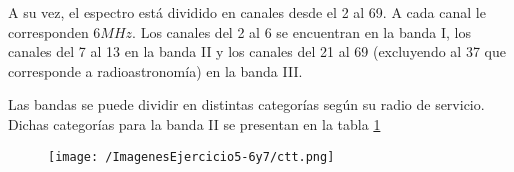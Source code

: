 A su vez, el espectro está dividido en canales desde el 2 al 69. A cada canal le corresponden $6 MHz$. Los canales del 2 al 6 se encuentran en la banda I, los canales del 7 al 13 en la banda II y los canales del 21 al 69 (excluyendo al 37 que corresponde a radioastronomía) en la banda III.

Las bandas se puede dividir en distintas categorías según su radio de servicio. Dichas categorías para la banda II se presentan en la tabla \ref{fig:ctt}

\begin{figure}[H]
	\centering
	\texttt{[image: /ImagenesEjercicio5-6y7/ctt.png]}
	\caption{}	
	\label{fig:ctt}
\end{figure}
